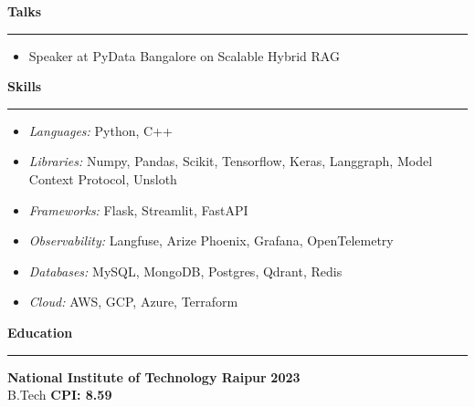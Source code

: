 \documentclass{article}%
\begin{document}
\begin{flushleft}
\bf{\Large{Talks}}
\end{flushleft}
\vspace{-1mm}
\noindent\rule{\textwidth}{0.4pt}
\begin{itemize}
\item Speaker at PyData Bangalore on Scalable Hybrid RAG\hfill
\href{https://www.linkedin.com/posts/pydata-bangalore_pydata-bangalore-machinelearning-activity-7298222664903495680-XK4G?utm_source=share&utm_medium=member_desktop&rcm=ACoAAC3guzgBLJ3ujDvj7NqMMjTw1_2SwpYn4dE}{\faLinkedin}\hspace{2mm}
\href{https://github.com/RheagalFire/Scalable-Hybrid-Rag}{\faGithub}\hspace{2mm}
\href{https://docs.google.com/presentation/d/1a6ENOwzwmHTZ1k66ErT51CDKL4EksXiEYehhHRsKwWU/edit?usp=sharing}{\faFilePowerpoint}
\end{itemize}

\begin{flushleft}
\bf{\Large{Skills}}
\end{flushleft}
\vspace{-1mm}
\noindent\rule{\textwidth}{0.4pt}
\begin{itemize}
\setlength\itemsep{0.01em}
\item \textit{Languages:} Python, C++
\item \textit{Libraries:} Numpy, Pandas, Scikit, Tensorflow, Keras, Langgraph, Model Context Protocol, Unsloth
\item \textit{Frameworks:} Flask, Streamlit, FastAPI
\item \textit{Observability:} Langfuse, Arize Phoenix, Grafana, OpenTelemetry
\item \textit{Databases:} MySQL, MongoDB, Postgres, Qdrant, Redis
\item \textit{Cloud:} AWS, GCP, Azure, Terraform
\end{itemize}
\vspace{1mm}
\begin{flushleft}
\bf{\Large{Education}}
\end{flushleft}
\vspace{-2mm}
\noindent\rule{\textwidth}{0.4pt}
\vspace{2mm}

\noindent
\textbf{National Institute of Technology Raipur} \hfill \textbf{2023} \\
B.Tech \hfill \textbf{CPI: 8.59}
\end{document}
